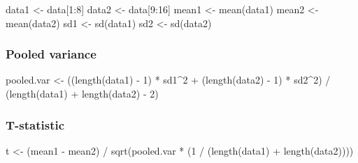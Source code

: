 \documentclass[
]{article}
\newenvironment{Shaded}{\begin{snugshade}}{\end{snugshade}}
\newcommand{\DecValTok}[1]{\textcolor[rgb]{0.00,0.00,0.81}{#1}}
\newcommand{\FunctionTok}[1]{\textcolor[rgb]{0.00,0.00,0.00}{#1}}
\newcommand{\NormalTok}[1]{#1}
\newcommand{\OtherTok}[1]{\textcolor[rgb]{0.56,0.35,0.01}{#1}}
\newcommand{\SpecialCharTok}[1]{\textcolor[rgb]{0.00,0.00,0.00}{#1}}
\begin{document}
\begin{Shaded}
\begin{Highlighting}[]
\NormalTok{data1 }\OtherTok{\textless{}{-}}\NormalTok{ data[}\DecValTok{1}\SpecialCharTok{:}\DecValTok{8}\NormalTok{]}
\NormalTok{data2 }\OtherTok{\textless{}{-}}\NormalTok{ data[}\DecValTok{9}\SpecialCharTok{:}\DecValTok{16}\NormalTok{]}
\NormalTok{mean1 }\OtherTok{\textless{}{-}} \FunctionTok{mean}\NormalTok{(data1)}
\NormalTok{mean2 }\OtherTok{\textless{}{-}} \FunctionTok{mean}\NormalTok{(data2)}
\NormalTok{sd1 }\OtherTok{\textless{}{-}} \FunctionTok{sd}\NormalTok{(data1)}
\NormalTok{sd2 }\OtherTok{\textless{}{-}} \FunctionTok{sd}\NormalTok{(data2)}
\end{Highlighting}
\end{Shaded}

\hypertarget{pooled-variance}{%
\subsubsection{Pooled variance}\label{pooled-variance}}

\begin{Shaded}
\begin{Highlighting}[]
\NormalTok{pooled.var }\OtherTok{\textless{}{-}}\NormalTok{ ((}\FunctionTok{length}\NormalTok{(data1) }\SpecialCharTok{{-}} \DecValTok{1}\NormalTok{) }\SpecialCharTok{*}\NormalTok{ sd1}\SpecialCharTok{\^{}}\DecValTok{2} \SpecialCharTok{+}\NormalTok{ (}\FunctionTok{length}\NormalTok{(data2) }\SpecialCharTok{{-}} \DecValTok{1}\NormalTok{) }\SpecialCharTok{*}\NormalTok{ sd2}\SpecialCharTok{\^{}}\DecValTok{2}\NormalTok{) }\SpecialCharTok{/}\NormalTok{ (}\FunctionTok{length}\NormalTok{(data1) }\SpecialCharTok{+} \FunctionTok{length}\NormalTok{(data2) }\SpecialCharTok{{-}} \DecValTok{2}\NormalTok{)}
\end{Highlighting}
\end{Shaded}

\hypertarget{t-statistic}{%
\subsubsection{T-statistic}\label{t-statistic}}

\begin{Shaded}
\begin{Highlighting}[]
\NormalTok{t }\OtherTok{\textless{}{-}}\NormalTok{ (mean1 }\SpecialCharTok{{-}}\NormalTok{ mean2) }\SpecialCharTok{/} \FunctionTok{sqrt}\NormalTok{(pooled.var }\SpecialCharTok{*}\NormalTok{ (}\DecValTok{1} \SpecialCharTok{/}\NormalTok{ (}\FunctionTok{length}\NormalTok{(data1) }\SpecialCharTok{+} \FunctionTok{length}\NormalTok{(data2))))}
\end{Highlighting}
\end{Shaded}
\end{document}
